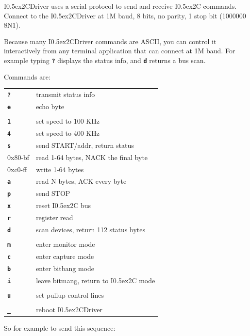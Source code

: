 \documentclass{article}
\newcommand{\two}{\raise0.5ex\hbox{\footnotesize{2}}}
\newcommand{\iic}{I\two{}C}
\newcommand{\iicdriver}{I\two{}CDriver}
\newcommand{\mach}[1]{\texttt{\textbf{#1}}}
\newcommand{\gap}{\vspace{10pt}}
\begin{document}
\iicdriver{} uses a serial protocol to send and receive \iic{} commands.
Connect to the \iicdriver{} at 1M baud, 8 bits, no parity, 1 stop bit (1000000 8N1).

Because many \iicdriver{} commands are ASCII, you can control it interactively from any
terminal application that can connect at 1M baud.
For example typing \mach{?} displays the status info,
and \mach{d} returns a bus scan.

Commands are:

\gap\begin{tabular}{ll}
\hline
  \mach{?}        & transmit status info \\
  \mach{e}        & echo byte \\
\\
  \mach{1}        & set speed to 100 KHz\\
  \mach{4}        & set speed to 400 KHz\\
  \mach{s}        & send START/addr, return status\\
  0x80-bf         & read 1-64 bytes, NACK the final byte\\
  0xc0-ff         & write 1-64 bytes\\
  \mach{a}        & read N bytes, ACK every byte\\
  \mach{p}        & send STOP\\
  \mach{x}        & reset \iic{} bus\\
  \mach{r}        & register read\\
  \mach{d}        & scan devices, return 112 status bytes\\
\\
  \mach{m}        & enter monitor mode\\
  \mach{c}        & enter capture mode\\
  \mach{b}        & enter bitbang mode\\
  \mach{i}        & leave bitmang, return to \iic{} mode\\
\\
  \mach{u}        & set pullup control lines\\
\\
  \mach{\_}       & reboot \iicdriver{}\\
\hline
\end{tabular}\gap

So for example to send this sequence:
\end{document}
